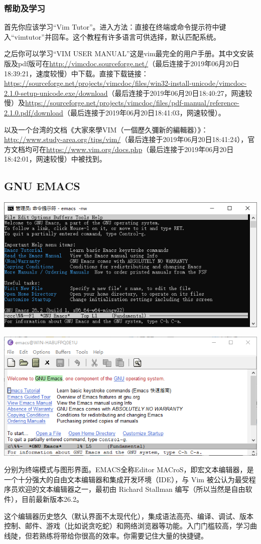 \subsubsection{帮助及学习}
首先你应该学习“Vim Tutor”。进入方法：直接在终端或命令提示符中键入“vimtutor”并回车。这个教程有许多语言可供选择，默认匹配系统。\par
之后你可以学习“VIM USER MANUAL”这是vim最完全的用户手册。其中文安装版及pdf版可在\url{http://vimcdoc.sourceforge.net/}（最后连接于2019年06月20日18:39:21，速度较慢）中下载。直接下载链接：\url{https://sourceforge.net/projects/vimcdoc/files/win32-install-unicode/vimcdoc-2.1.0-setup-unicode.exe/download}（最后连接于2019年06月20日18:40:27，网速较慢）及\url{https://sourceforge.net/projects/vimcdoc/files/pdf-manual/reference-2.1.0.pdf/download}（最后连接于2019年06月20日18:41:03，网速较慢）。\par
以及一个台湾的文档《大家來學VIM（一個歷久彌新的編輯器）》：\url{http://www.study-area.org/tips/vim/}（最后连接于2019年06月20日18:41:24），官方文档均可在\url{https://www.vim.org/docs.php}（最后连接于2019年06月20日18:42:01，网速较慢）中被找到。
\subsection{GNU EMACS}
\begin{center}
	\includegraphics[scale=0.8]{pic/emacs-terminal}\par   \includegraphics[scale=0.8]{pic/Emacs-GUI}
\end{center} \par
分别为终端模式与图形界面。EMACS全称Editor MACroS，即宏文本编辑器，是一个十分强大的自由文本编辑器和集成开发环境（IDE），与 Vim 被公认为最受程序员欢迎的文本编辑器之一，最初由 Richard Stallman 编写（所以当然是自由软件），目前最新版本26.2。\par
这个编辑器历史悠久（默认界面不太现代化），集成语法高亮、编译、调试、版本控制、邮件、游戏（比如说贪吃蛇）和网络浏览器等功能。入门门槛较高，学习曲线陡，但若熟练将带给你很高的效率。你需要记住大量的快捷键。\par
